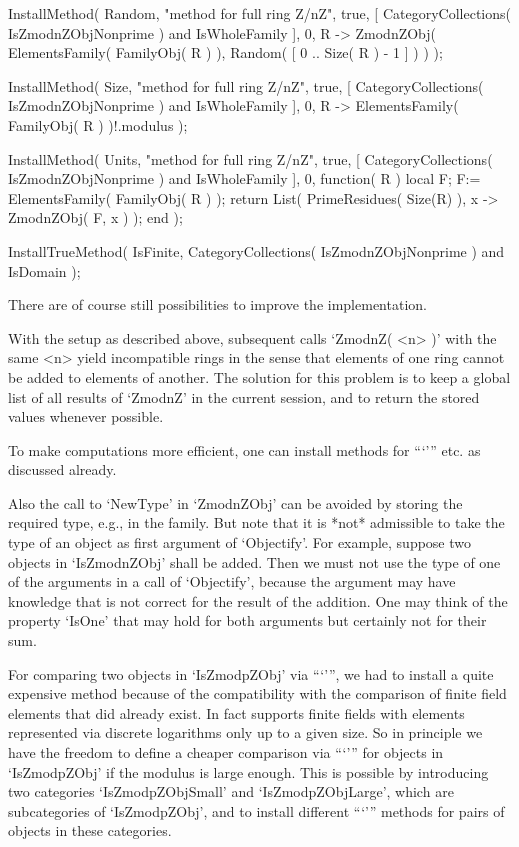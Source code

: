     InstallMethod( Random,
        "method for full ring Z/nZ",
        true,
        [ CategoryCollections( IsZmodnZObjNonprime ) and IsWholeFamily ],
        0,
        R -> ZmodnZObj( ElementsFamily( FamilyObj( R ) ),
                        Random( [ 0 .. Size( R ) - 1 ] ) ) );

    InstallMethod( Size,
        "method for full ring Z/nZ",
        true,
        [ CategoryCollections( IsZmodnZObjNonprime ) and IsWholeFamily ],
        0,
        R -> ElementsFamily( FamilyObj( R ) )!.modulus );

    InstallMethod( Units,
        "method for full ring Z/nZ",
        true,
        [ CategoryCollections( IsZmodnZObjNonprime ) and IsWholeFamily ],
        0,
        function( R )
        local F;
        F:= ElementsFamily( FamilyObj( R ) );
        return List( PrimeResidues( Size(R) ), x -> ZmodnZObj( F, x ) );
        end );

    InstallTrueMethod( IsFinite,
        CategoryCollections( IsZmodnZObjNonprime ) and IsDomain );
\endexample



There are of course still possibilities to improve the implementation.

With the setup as described above,
subsequent calls `ZmodnZ( <n> )' with the same <n> yield incompatible
rings in the sense that elements of one ring cannot be added to elements
of another.
The solution for this problem is to keep a global list of all results of
`ZmodnZ' in the current {\GAP} session, and to return the stored values
whenever possible.

To make computations more efficient,
one can install methods for ```\-''' etc. as discussed already.

Also the call to `NewType' in `ZmodnZObj' can be avoided by storing
the required type, e.g., in the family.
But note that it is *not* admissible to take the type of an object
as first argument of `Objectify'.
For example, suppose two objects in `IsZmodnZObj' shall be added.
Then we must not use the type of one of the arguments in a call of
`Objectify', because the argument may have knowledge that is not
correct for the result of the addition.
One may think of the property `IsOne' that may hold for both
arguments but certainly not for their sum.

For comparing two objects in `IsZmodpZObj' via ```\<''',
we had to install a quite expensive method because of the compatibility
with the comparison of finite field elements that did already exist.
In fact {\GAP} supports finite fields with elements represented via
discrete logarithms only up to a given size.
So in principle we have the freedom to define a cheaper comparison
via ```\<''' for objects in `IsZmodpZObj' if the modulus is large
enough.
This is possible by introducing two categories `IsZmodpZObjSmall'
and `IsZmodpZObjLarge', which are subcategories of `IsZmodpZObj',
and to install different ```\<''' methods for pairs of objects
in these categories.



